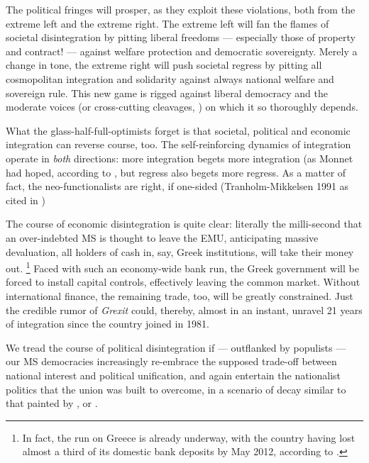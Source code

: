 The political fringes will prosper, as they exploit these violations, both from the extreme left and the extreme right.
The extreme left will fan the flames of societal disintegration by pitting liberal freedoms --- especially those of property and contract! --- against welfare protection and democratic sovereignty.
Merely a change in tone, the extreme right will push societal regress by pitting all cosmopolitan integration and solidarity against always national welfare and sovereign rule.
This new game is rigged against liberal democracy and the moderate voices (or cross-cutting cleavages, \citealt{LipsetRokkan-1967-aa}) on which it so thoroughly depends.

What the glass-half-full-optimists forget is that societal, political and economic integration can reverse course, too.
The self-reinforcing dynamics of integration operate in \emph{both} directions:
more integration begets more integration (as Monnet had hoped, according to \cite[948]{Schmitter1999}, but regress also begets more regress.
As a matter of fact, the neo-functionalists are right, if one-sided (Tranholm-Mikkelsen 1991 as cited in \citealt[1]{Bieler2003})

The course of economic disintegration is quite clear:
literally the milli-second that an over-indebted \gls{MS} is thought to leave the \gls{EMU}, anticipating massive devaluation, all holders of cash in, say, Greek institutions, will take their money out.
\footnote{
	In fact, the run on Greece is already underway, with the country having lost almost a third of its domestic bank deposits by May 2012, according to \cite{TheEconomist2012}.
}
Faced with such an economy-wide bank run, the Greek government will be forced to install capital controls, effectively leaving the common market.
Without international finance, the remaining trade, too, will be greatly constrained.
Just the credible rumor of \emph{Grexit} could, thereby, almost in an instant, unravel 21 years of integration since the country joined in 1981.

We tread the course of political disintegration if --- outflanked by populists --- our \gls{MS} democracies increasingly re-embrace the supposed trade-off between national interest and political unification, and again entertain the nationalist politics that the union was built to overcome, in a scenario of decay similar to that painted by \cite[339ff]{BeckGrande-2007-aa}, or \cite[947]{Schmitter1999}.

